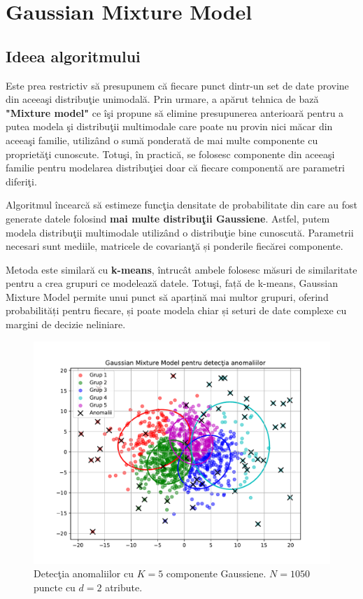 \section{Gaussian Mixture Model}

\subsection{Ideea algoritmului}

Este prea restrictiv să presupunem că fiecare punct dintr-un set de date 
provine din aceeaşi distribuţie unimodală. Prin urmare, a apărut tehnica de bază 
\textbf{"Mixture model"} ce îşi propune să elimine presupunerea anterioară pentru 
a putea modela şi distribuţii multimodale care poate nu provin nici măcar din aceeaşi 
familie, utilizând o sumă ponderată de mai multe componente cu proprietăţi
cunoscute. Totuşi, în practică, se folosesc componente din aceeaşi familie pentru 
modelarea distribuţiei doar că fiecare componentă are parametri diferiţi.

Algoritmul încearcă să estimeze funcţia densitate de probabilitate 
din care au fost generate datele folosind 
\textbf{mai multe distribuţii Gaussiene}.
Astfel, putem modela distribuţii multimodale utilizând o distribuţie bine cunoscută.
Parametrii necesari sunt mediile, matricele de 
covarianţă și ponderile fiecărei componente.

Metoda este similară cu \textbf{k-means}, întrucât ambele folosesc 
măsuri de similaritate pentru a crea grupuri
ce modelează datele. Totuşi, față de k-means,
Gaussian Mixture Model permite unui punct să aparțină 
mai multor grupuri, oferind probabilități pentru fiecare,
și poate modela chiar și seturi de date complexe 
cu margini de decizie neliniare.

\begin{figure}[H]
    \centering
    \includegraphics[width=\linewidth]{images/gmm_anomalies.pdf}
    \caption{Detecţia anomaliilor cu $K=5$ componente Gaussiene.
    $N=1050$ puncte cu $d=2$ atribute.}
\end{figure}

